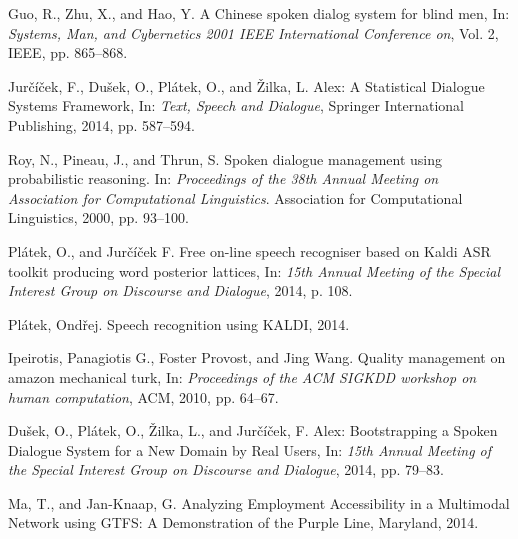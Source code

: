 
\def\bibname{Bibliography}
\begin{thebibliography}{99}
\addcontentsline{toc}{chapter}{\bibname}




{Guo, R., Zhu, X., and Hao, Y.}
A Chinese spoken dialog system for blind men,
In: \emph{Systems, Man, and Cybernetics 2001 IEEE International Conference on},
Vol. 2, IEEE, pp. 865--868.

{\sc Jurčíček, F., Dušek, O., Plátek, O., and Žilka, L.}
Alex: A Statistical Dialogue Systems Framework,
In: \emph{Text, Speech and Dialogue},
Springer International Publishing, 2014, pp. 587--594.


{\sc Roy, N., Pineau, J., and Thrun, S.}
Spoken dialogue management using probabilistic reasoning.
In: \emph{Proceedings of the 38th Annual Meeting on Association for Computational Linguistics}.
Association for Computational Linguistics, 2000, pp. 93--100.

{\sc Plátek, O., and Jurčíček F.}
Free on-line speech recogniser based on Kaldi ASR toolkit producing word posterior lattices,
In: \emph{15th Annual Meeting of the Special Interest Group on Discourse and Dialogue},
2014, p. 108.

{\sc Plátek, Ondřej.}
Speech recognition using KALDI,
2014.

{\sc Ipeirotis, Panagiotis G., Foster Provost, and Jing Wang.}
Quality management on amazon mechanical turk,
In: \emph{Proceedings of the ACM SIGKDD workshop on human computation},
ACM, 2010, pp. 64--67.

{\sc Dušek, O., Plátek, O., Žilka, L., and Jurčíček, F.}
Alex: Bootstrapping a Spoken Dialogue System for a New Domain by Real Users,
In: \emph{15th Annual Meeting of the Special Interest Group on Discourse and Dialogue},
2014, pp. 79--83.

{\sc Ma, T., and Jan-Knaap, G.}
Analyzing Employment Accessibility in a Multimodal Network using GTFS: A Demonstration of the Purple Line, Maryland,
2014.


\end{thebibliography}

